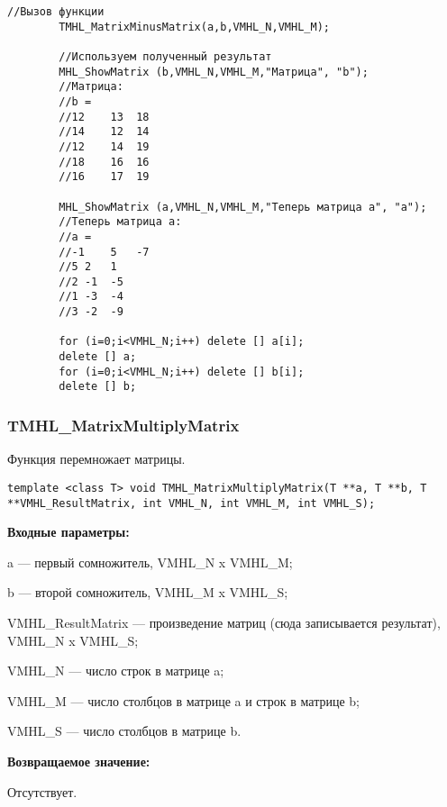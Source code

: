 \documentclass[a4paper,12pt]{article}
\begin{document}
\begin{lstlisting}[label=code_use_TMHL_MatrixMinusMatrix,caption=Пример использования]
        //Вызов функции
        TMHL_MatrixMinusMatrix(a,b,VMHL_N,VMHL_M);

        //Используем полученный результат
        MHL_ShowMatrix (b,VMHL_N,VMHL_M,"Матрица", "b");
        //Матрица:
        //b =
        //12	13	18
        //14	12	14
        //12	14	19
        //18	16	16
        //16	17	19

        MHL_ShowMatrix (a,VMHL_N,VMHL_M,"Теперь матрица a", "a");
        //Теперь матрица a:
        //a =
        //-1	5	-7
        //5	2	1
        //2	-1	-5
        //1	-3	-4
        //3	-2	-9

        for (i=0;i<VMHL_N;i++) delete [] a[i];
        delete [] a;
        for (i=0;i<VMHL_N;i++) delete [] b[i];
        delete [] b;
\end{lstlisting}

\subsubsection{TMHL\_MatrixMultiplyMatrix}\label{TMHL_MatrixMultiplyMatrix}

Функция перемножает матрицы.


\begin{lstlisting}[label=code_syntax_TMHL_MatrixMultiplyMatrix,caption=Синтаксис]
template <class T> void TMHL_MatrixMultiplyMatrix(T **a, T **b, T **VMHL_ResultMatrix, int VMHL_N, int VMHL_M, int VMHL_S);
\end{lstlisting}

\textbf{Входные параметры:}

a --- первый сомножитель, VMHL\_N x VMHL\_M;
 
b --- второй сомножитель, VMHL\_M x VMHL\_S;
 
VMHL\_ResultMatrix --- произведение матриц (сюда записывается результат), VMHL\_N x VMHL\_S;
 
VMHL\_N --- число строк в матрице a;
 
VMHL\_M --- число столбцов в матрице a и строк в матрице b;
 
VMHL\_S --- число столбцов в матрице b.

\textbf{Возвращаемое значение:}

Отсутствует.
\end{document}

